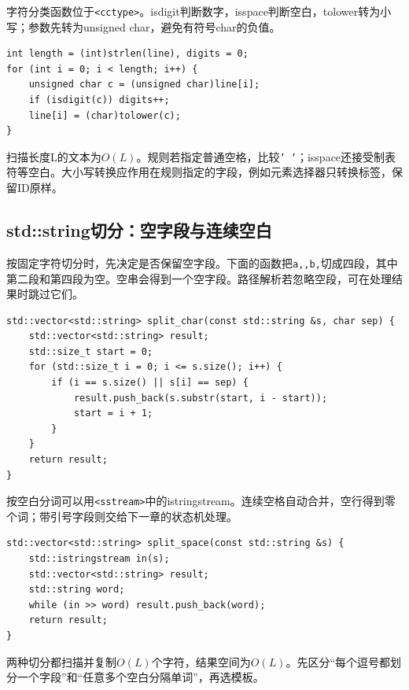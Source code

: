 \documentclass[UTF8,11pt,a4paper,fontset=none]{ctexart}
\begin{document}
字符分类函数位于\texttt{<cctype>}。isdigit判断数字，isspace判断空白，tolower转为小写；参数先转为unsigned char，避免有符号char的负值。
\par\noindent\begin{minipage}{\linewidth}
\begin{lstlisting}
int length = (int)strlen(line), digits = 0;
for (int i = 0; i < length; i++) {
    unsigned char c = (unsigned char)line[i];
    if (isdigit(c)) digits++;
    line[i] = (char)tolower(c);
}
\end{lstlisting}
\end{minipage}\par
扫描长度L的文本为$O(L)$。规则若指定普通空格，比较\texttt{' '}；isspace还接受制表符等空白。大小写转换应作用在规则指定的字段，例如元素选择器只转换标签，保留ID原样。

\subsection{std::string切分：空字段与连续空白}
按固定字符切分时，先决定是否保留空字段。下面的函数把\texttt{a,,b,}切成四段，其中第二段和第四段为空。空串会得到一个空字段。路径解析若忽略空段，可在处理结果时跳过它们。
\par\noindent\begin{minipage}{\linewidth}
\begin{lstlisting}
std::vector<std::string> split_char(const std::string &s, char sep) {
    std::vector<std::string> result;
    std::size_t start = 0;
    for (std::size_t i = 0; i <= s.size(); i++) {
        if (i == s.size() || s[i] == sep) {
            result.push_back(s.substr(start, i - start));
            start = i + 1;
        }
    }
    return result;
}
\end{lstlisting}
\end{minipage}\par
按空白分词可以用\texttt{<sstream>}中的istringstream。连续空格自动合并，空行得到零个词；带引号字段则交给下一章的状态机处理。
\par\noindent\begin{minipage}{\linewidth}
\begin{lstlisting}
std::vector<std::string> split_space(const std::string &s) {
    std::istringstream in(s);
    std::vector<std::string> result;
    std::string word;
    while (in >> word) result.push_back(word);
    return result;
}
\end{lstlisting}
\end{minipage}\par
两种切分都扫描并复制$O(L)$个字符，结果空间为$O(L)$。先区分“每个逗号都划分一个字段”和“任意多个空白分隔单词”，再选模板。
\end{document}
